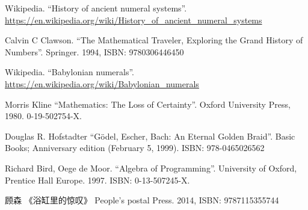 \documentclass[UTF8]{article}
\begin{document}
\begin{Exercise}
\end{Exercise}

\ifx\wholebook\relax \else
\begin{thebibliography}{99}

Wikipedia. ``History of ancient numeral systems''. \url{https://en.wikipedia.org/wiki/History_of_ancient_numeral_systems}

Calvin C Clawson. ``The Mathematical Traveler, Exploring the Grand History of Numbers''. Springer. 1994, ISBN: 9780306446450

Wikipedia. ``Babylonian numerals''. \url{https://en.wikipedia.org/wiki/Babylonian_numerals}

Morris Kline ``Mathematics: The Loss of Certainty''. Oxford University Press, 1980. 0-19-502754-X.

Douglas R. Hofstadter ``Gödel, Escher, Bach: An Eternal Golden Braid''. Basic Books; Anniversary edition (February 5, 1999). ISBN: 978-0465026562

Richard Bird, Oege de Moor. ``Algebra of Programming''. University of Oxford, Prentice Hall Europe. 1997. ISBN: 0-13-507245-X.

{\fontspec{\cnmainft}顾森 《浴缸里的惊叹》} People's postal Press. 2014, ISBN: 9787115355744

\end{thebibliography}

\expandafter\enddocument

\fi
\end{document}

